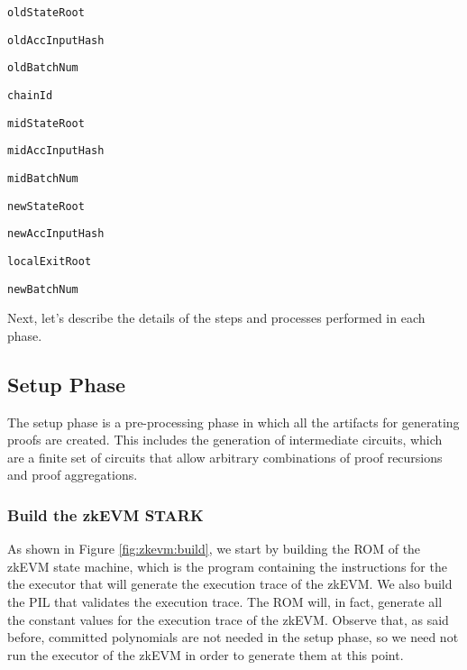 \vspace{0.15cm}
\begin{compactitem}

\item \texttt{oldStateRoot}

\item \texttt{oldAccInputHash}

\item \texttt{oldBatchNum}

\item \texttt{chainId}

\item \texttt{midStateRoot}

\item \texttt{midAccInputHash}

\item \texttt{midBatchNum}

\item \texttt{newStateRoot}

\item \texttt{newAccInputHash}

\item \texttt{localExitRoot}

\item \texttt{newBatchNum}
\end{compactitem}

Next, let's describe the details of the steps and processes performed in each phase.

\subsection{Setup Phase}

The setup phase is a pre-processing phase in which all the artifacts for generating proofs are created. This includes the generation of intermediate circuits, which 
are a finite set of circuits that allow arbitrary combinations of proof recursions and proof aggregations.


\subsubsection{Build the zkEVM STARK}

As shown in Figure \ref{fig:zkevm:build}, we start by building the ROM of the zkEVM state machine, which is the program containing the instructions for the the executor that will generate the execution trace of the zkEVM. We also build the PIL that validates the execution trace. The ROM will, in fact, generate all the constant values for the execution trace of the zkEVM. Observe that, as said before, committed polynomials are not needed in the setup phase, so we need not run the executor of the zkEVM in order to generate them at this point. 

